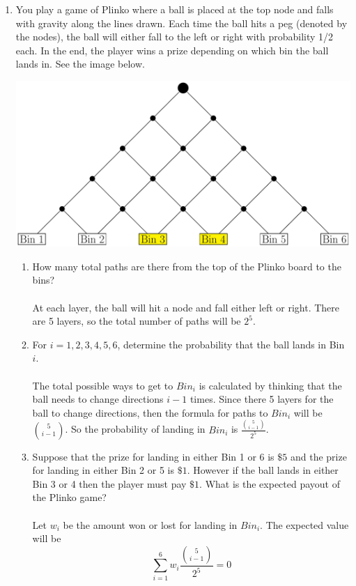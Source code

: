 \documentclass[12pt]{article}
\begin{document}
\begin{enumerate}
\item You play a game of Plinko where a ball is placed at the top node and falls with gravity along the lines drawn. Each time the ball hits a peg (denoted by the nodes), the ball will either fall to the left or right with probability 1/2 each. In the end, the player wins a prize depending on which bin the ball lands in. See the image below.

\begin{center}
\includegraphics[scale=.66]{hw4_img1.pdf}
\end{center}

\begin{enumerate}
\item How many total paths are there from the top of the Plinko board to the bins?\\\\
At each layer, the ball will hit a node and fall either left or right. There are 5 layers, so the total number of paths will be $2^5$.

\item For $i = 1,2,3,4,5,6$, determine the probability that the ball lands in Bin $i$.\\\\
The total possible ways to get to $Bin_i$ is calculated by thinking that the ball needs to change directions $i-1$ times. Since there 5 layers for the ball to change directions, then the formula for paths to $Bin_i$ will be $\binom{5}{i-1}$. So the probability of landing in $Bin_i$ is $\frac{\binom{5}{i-1}}{2^5}$.

\item Suppose that the prize for landing in either Bin 1 or 6 is $\$5$ and the prize for landing in either Bin 2 or 5 is $\$1$. However if the ball lands in either Bin 3 or 4 then the player must pay $\$1$. What is the expected payout of the Plinko game?\\\\
Let $w_i$ be the amount won or lost for landing in $Bin_i$. The expected value will be \[\sum_{i=1}^{6} w_i\frac{\binom{5}{i-1}}{2^5} = 0\]
\end{enumerate}
\end{enumerate}
\end{document}

